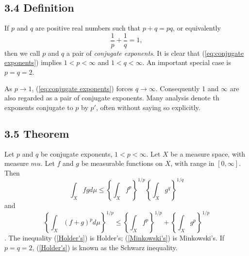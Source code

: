 \documentclass[11pt,reqno]{article}
\renewcommand{\(}{\left(}
\renewcommand{\)}{\right)}
\renewcommand{\[}{\left[}
\renewcommand{\]}{\right]}
\begin{document}
\subsection{3.4 Definition}

If $p$ and $q$ are positive real numbers such that $p + q = pq$, or equivalently 
\begin{equation} \label{eq:conjugate exponents}
  \frac{1}{p} + \frac{1}{q} = 1,
\end{equation}
then we call $p$ and $q$ a pair of \textit{conjugate exponents}. It is clear that (\ref{eq:conjugate exponents})
implies $1 < p < \infty$ and $1 < q < \infty$. An important special case is $p = q = 2$. 

As $p \to 1$, (\ref{eq:conjugate exponents}) forces $q \to \infty$. Consequently 1 and $\infty$ are also regarded as a pair of 
conjugate exponents. Many analysis denote th exponents conjugate to $p$ by $p'$, often without saying so explicitly.

\subsection{3.5 Theorem}

Let $p$ and $q$ be conjugate exponents, $1 < p < \infty$. Let $X$ be a measure space, with measure $mu$. Let $f$ and $g$ be 
measurable functions on $X$, with range in $[0, \infty]$. Then
\begin{equation} \label{Holder's}
  \int_X fg d \mu \le \left\{ \int_X f^p \right\}^{1/p} \left\{ \int_X g^q \right\}^{1/q}
\end{equation}
and
\begin{equation} \label{Minkowski's}
  \left\{ \int_X (f + g)^p d \mu \right\}^{1/p} \le \left\{ \int_X f^p \right\}^{1/p} +  \left\{ \int_X g^p \right\}^{1/p}
\end{equation}.
The inequality (\ref{Holder's}) is Holder's; (\ref{Minkowski's}) is Minkowski's. If $p=q=2$, (\ref{Holder's}) is known as
the Schwarz inequality.
\end{document}
